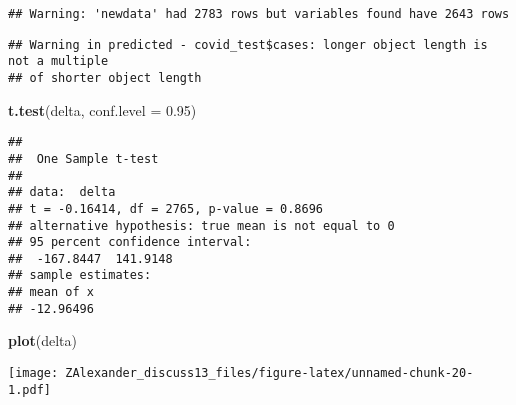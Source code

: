 \documentclass[
]{article}
\newenvironment{Shaded}{\begin{snugshade}}{\end{snugshade}}
\newcommand{\DataTypeTok}[1]{\textcolor[rgb]{0.13,0.29,0.53}{#1}}
\newcommand{\FloatTok}[1]{\textcolor[rgb]{0.00,0.00,0.81}{#1}}
\newcommand{\KeywordTok}[1]{\textcolor[rgb]{0.13,0.29,0.53}{\textbf{#1}}}
\newcommand{\NormalTok}[1]{#1}
\newcommand{\OperatorTok}[1]{\textcolor[rgb]{0.81,0.36,0.00}{\textbf{#1}}}
\newcommand{\StringTok}[1]{\textcolor[rgb]{0.31,0.60,0.02}{#1}}
\begin{document}
\begin{verbatim}
## Warning: 'newdata' had 2783 rows but variables found have 2643 rows
\end{verbatim}

\begin{Shaded}
\end{Shaded}

\begin{verbatim}
## Warning in predicted - covid_test$cases: longer object length is not a multiple
## of shorter object length
\end{verbatim}

\begin{Shaded}
\begin{Highlighting}[]
\KeywordTok{t.test}\NormalTok{(delta, }\DataTypeTok{conf.level =} \FloatTok{0.95}\NormalTok{)}
\end{Highlighting}
\end{Shaded}

\begin{verbatim}
## 
##  One Sample t-test
## 
## data:  delta
## t = -0.16414, df = 2765, p-value = 0.8696
## alternative hypothesis: true mean is not equal to 0
## 95 percent confidence interval:
##  -167.8447  141.9148
## sample estimates:
## mean of x 
## -12.96496
\end{verbatim}

\begin{Shaded}
\begin{Highlighting}[]
\KeywordTok{plot}\NormalTok{(delta)}
\end{Highlighting}
\end{Shaded}

\texttt{[image: ZAlexander\_discuss13\_files/figure-latex/unnamed-chunk-20-1.pdf]}
\end{document}
